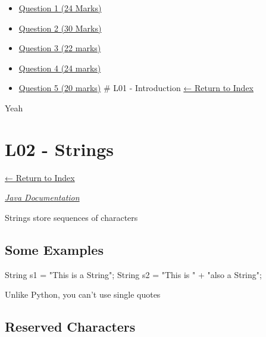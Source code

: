 \documentclass[]{article}
\newenvironment{Shaded}{}{}
\newcommand{\BuiltInTok}[1]{#1}
\newcommand{\NormalTok}[1]{#1}
\newcommand{\StringTok}[1]{\textcolor[rgb]{0.25,0.44,0.63}{#1}}
\providecommand{\tightlist}{%
  \setlength{\itemsep}{0pt}\setlength{\parskip}{0pt}}
\begin{document}
\begin{itemize}
\begin{itemize}
    \begin{itemize}
    \tightlist
    \item
      \protect\hyperlink{question-1-24-marks}{Question 1 (24 Marks)}
    \item
      \protect\hyperlink{question-2-30-marks}{Question 2 (30 Marks)}
    \item
      \protect\hyperlink{question-3-22-marks}{Question 3 (22 marks)}
    \item
      \protect\hyperlink{question-4-24-marks}{Question 4 (24 marks)}
    \item
      \protect\hyperlink{question-5-20-marks}{Question 5 (20 marks)} \#
      L01 - Introduction \protect\hyperlink{table-of-contents}{← Return
      to Index}
    \end{itemize}
  \end{itemize}
\end{itemize}

Yeah

\hypertarget{l02---strings}{%
\section{L02 - Strings}\label{l02---strings}}

\protect\hyperlink{table-of-contents}{← Return to Index}

\emph{\href{https://docs.oracle.com/javase/8/docs/api/java/lang/String.html}{Java
Documentation}}

Strings store sequences of characters

\hypertarget{some-examples}{%
\subsection{Some Examples}\label{some-examples}}

\begin{Shaded}
\begin{Highlighting}[]
\BuiltInTok{String}\NormalTok{ s1 = }\StringTok{"This is a String"}\NormalTok{;}
\BuiltInTok{String}\NormalTok{ s2 = }\StringTok{"This is "}\NormalTok{ + }\StringTok{"also a String"}\NormalTok{;}
\end{Highlighting}
\end{Shaded}

Unlike Python, you can't use single quotes

\hypertarget{reserved-characters}{%
\subsection{Reserved Characters}\label{reserved-characters}}
\end{document}
